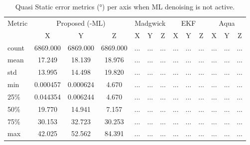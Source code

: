 \documentclass{iutbscthesis}
\begin{document}
\begin{table}[ht]
\centering
\caption{Quasi Static error metrics (°) per axis when ML denoising is not active.}
\label{tab:quasi_no_ml}
\begin{tabular}{l
  *{4}{ccc}
}
\toprule
Metric & \multicolumn{3}{c}{Proposed (-ML)} & \multicolumn{3}{c}{Madgwick} & \multicolumn{3}{c}{EKF} & \multicolumn{3}{c}{Aqua} \\
 & X & Y & Z & X & Y & Z & X & Y & Z & X & Y & Z \\
\midrule
count & 6869.000 & 6869.000 & 6869.000 & ... & ... & ... & ... & ... & ... & ... & ... & ... \\
mean & 17.249 & 18.139 & 18.976 & ... & ... & ... & ... & ... & ... & ... & ... & ... \\
std & 13.995 & 14.498 & 19.820 & ... & ... & ... & ... & ... & ... & ... & ... & ... \\
min & 0.000457 & 0.000624 & 4.670 & ... & ... & ... & ... & ... & ... & ... & ... & ... \\
25\% & 0.044354 & 0.006244 & 4.670 & ... & ... & ... & ... & ... & ... & ... & ... & ... \\
50\% & 19.770 & 14.941 & 7.157 & ... & ... & ... & ... & ... & ... & ... & ... & ... \\
75\% & 30.153 & 32.723 & 30.253 & ... & ... & ... & ... & ... & ... & ... & ... & ... \\
max & 42.025 & 52.562 & 84.391 & ... & ... & ... & ... & ... & ... & ... & ... & ... \\
\bottomrule
\end{tabular}
\end{table}
\end{document}
